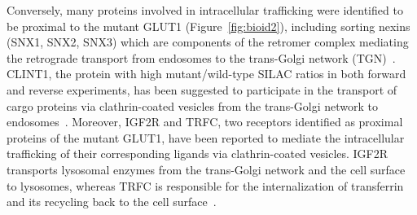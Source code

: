 Conversely, many proteins involved in intracellular trafficking were identified to be proximal to the mutant GLUT1 (Figure~\ref{fig:bioid2}), including sorting nexins (SNX1, SNX2, SNX3) which are components of the retromer complex mediating the retrograde transport from endosomes to the trans-Golgi network (TGN)~\cite{Rojas,Carlton,Mari,Harterink}. CLINT1, the protein with high mutant/wild-type SILAC ratios in both forward and reverse experiments, has been suggested to participate in the transport of cargo proteins via clathrin-coated vesicles from the trans-Golgi network to endosomes~\cite{Mills,Kalthoff,Hirst}. Moreover, IGF2R and TRFC, two receptors identified as proximal proteins of the mutant GLUT1, have been reported to mediate the intracellular trafficking of their corresponding ligands via clathrin-coated vesicles. IGF2R transports lysosomal enzymes from the trans-Golgi network and the cell surface to lysosomes, whereas TRFC is responsible for the internalization of transferrin and its recycling back to the cell surface~\cite{Byrd,Daro}. 

